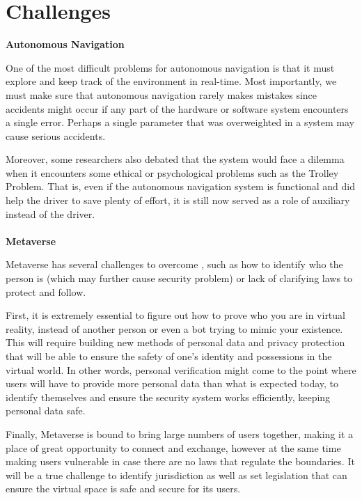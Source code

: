 \section{Challenges}
\label{section:challenges}
\textbf{Autonomous Navigation}

One of the most difficult problems for autonomous navigation is that it must explore and keep track of the environment in real-time. Most importantly, we must make sure that autonomous navigation rarely makes mistakes since accidents might occur if any part of the hardware or software system encounters a single error. Perhaps a single parameter that was overweighted in a system may cause serious accidents.

Moreover, some researchers also debated that the system would face a dilemma when it encounters some ethical or psychological problems such as the Trolley Problem. That is, even if the autonomous navigation system is functional and did help the driver to save plenty of effort, it is still now served as a role of auxiliary instead of the driver.
\\\\
\textbf{Metaverse}

Metaverse has several challenges to overcome \cite{metaverseChallenge}, such as how to identify who the person is (which may further cause security problem) or lack of clarifying laws to protect and follow.

First, it is extremely essential to figure out how to prove who you are in virtual reality, instead of another person or even a bot trying to mimic your existence. This will require building new methods of personal data and privacy protection that will be able to ensure the safety of one’s identity and possessions in the virtual world. In other words, personal verification might come to the point where users will have to provide more personal data than what is expected today, to identify themselves and ensure the security system works efficiently, keeping personal data safe.

Finally, Metaverse is bound to bring large numbers of users together, making it a place of great opportunity to connect and exchange, however at the same time making users vulnerable in case there are no laws that regulate the boundaries. It will be a true challenge to identify jurisdiction as well as set legislation that can ensure the virtual space is safe and secure for its users.